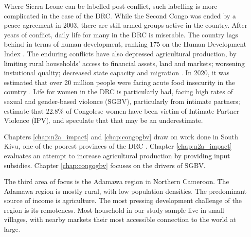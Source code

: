Where Sierra Leone can be labelled post-conflict, such labelling is more complicated in the case of the DRC. While the Second Congo was ended by a peace agreement in 2003, there are still armed groups active in the country. After years of conflict, daily life for many in the DRC is miserable. The country lags behind in terms of human development, ranking 175 on the Human Development Index \citep{UNDP2020a}. The enduring conflicts have also depressed agricultural production, by limiting rural households' access to financial assets, land and markets; worsening instutional quality; decreased state capacity and migration  \citep{Lecoutere2005, Vlassenroot}. In 2020, it was estimated that over 20 million people were facing acute food insecurity in the country \citep{FAO2020}. Life for women in the DRC is particularly bad, facing high rates of sexual and gender-based violonce (SGBV), particularly from intimate partners; \cite{Peterman2011} estimate that 22.8\% of Congolese women have been victim of Intimate Partner Violence (IPV), and speculate that that may be an underestimate.

Chapters \ref{chap:n2a_impact} and \ref{chap:congogbv} draw on work done in South Kivu, one of the poorest provinces of the DRC \citep{Ansoms2009}. Chapter \ref{chap:n2a_impact} evaluates an attempt to increase agricultural production by providing input subsidies. Chapter \ref{chap:congogbv} focuses on the drivers of SGBV.

The third area of focus is the Adamawa region in Northern Cameroon. The Adamawa region is mostly rural, with low population densities. The predominant source of income is agriculture. The most pressing development challenge of the region is its remoteness. Most household in our study sample live in small villages, with nearby markets their most accessible connection to the world at large.


